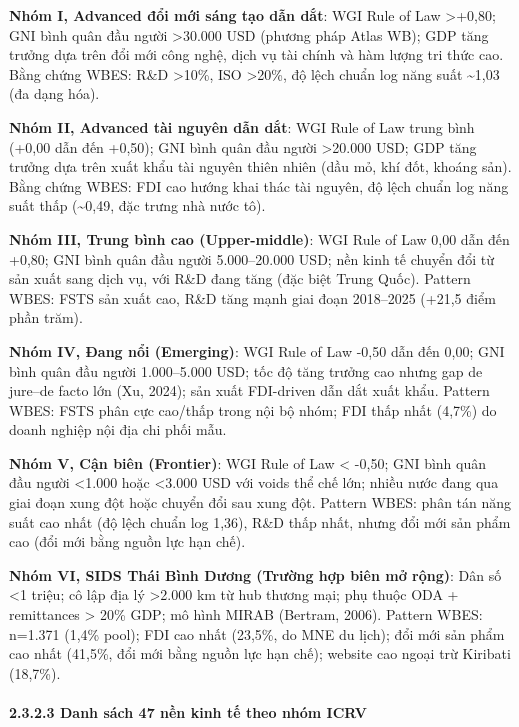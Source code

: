\documentclass[12pt,a4paper]{article}
\begin{document}
\textbf{Nhóm I, Advanced đổi mới sáng tạo dẫn dắt}: WGI Rule of Law
\textgreater+0,80; GNI bình quân đầu người \textgreater30.000 USD
(phương pháp Atlas WB); GDP tăng trưởng dựa trên đổi mới công nghệ, dịch
vụ tài chính và hàm lượng tri thức cao. Bằng chứng WBES: R\&D
\textgreater10\%, ISO \textgreater20\%, độ lệch chuẩn log năng suất
\textasciitilde1,03 (đa dạng hóa).

\textbf{Nhóm II, Advanced tài nguyên dẫn dắt}: WGI Rule of Law trung
bình (+0,00 dẫn đến +0,50); GNI bình quân đầu người \textgreater20.000
USD; GDP tăng trưởng dựa trên xuất khẩu tài nguyên thiên nhiên (dầu mỏ,
khí đốt, khoáng sản). Bằng chứng WBES: FDI cao hướng khai thác tài
nguyên, độ lệch chuẩn log năng suất thấp (\textasciitilde0,49, đặc trưng
nhà nước tô).

\textbf{Nhóm III, Trung bình cao (Upper-middle)}: WGI Rule of Law 0,00
dẫn đến +0,80; GNI bình quân đầu người 5.000--20.000 USD; nền kinh tế
chuyển đổi từ sản xuất sang dịch vụ, với R\&D đang tăng (đặc biệt Trung
Quốc). Pattern WBES: FSTS sản xuất cao, R\&D tăng mạnh giai đoạn
2018--2025 (+21,5 điểm phần trăm).

\textbf{Nhóm IV, Đang nổi (Emerging)}: WGI Rule of Law -0,50 dẫn đến
0,00; GNI bình quân đầu người 1.000--5.000 USD; tốc độ tăng trưởng cao
nhưng gap de jure--de facto lớn (Xu, 2024); sản xuất FDI-driven dẫn dắt
xuất khẩu. Pattern WBES: FSTS phân cực cao/thấp trong nội bộ nhóm; FDI
thấp nhất (4,7\%) do doanh nghiệp nội địa chi phối mẫu.

\textbf{Nhóm V, Cận biên (Frontier)}: WGI Rule of Law \textless{} -0,50;
GNI bình quân đầu người \textless1.000 hoặc \textless3.000 USD với voids
thể chế lớn; nhiều nước đang qua giai đoạn xung đột hoặc chuyển đổi sau
xung đột. Pattern WBES: phân tán năng suất cao nhất (độ lệch chuẩn log
1,36), R\&D thấp nhất, nhưng đổi mới sản phẩm cao (đổi mới bằng nguồn
lực hạn chế).

\textbf{Nhóm VI, SIDS Thái Bình Dương (Trường hợp biên mở rộng)}: Dân số
\textless1 triệu; cô lập địa lý \textgreater2.000 km từ hub thương mại;
phụ thuộc ODA + remittances \textgreater{} 20\% GDP; mô hình MIRAB
(Bertram, 2006). Pattern WBES: n=1.371 (1,4\% pool); FDI cao nhất
(23,5\%, do MNE du lịch); đổi mới sản phẩm cao nhất (41,5\%, đổi mới
bằng nguồn lực hạn chế); website cao ngoại trừ Kiribati (18,7\%).

\hypertarget{2323-danh-suxe1ch-47-nux1ec1n-kinh-tux1ebf-theo-nhuxf3m-icrv}{%
\paragraph{2.3.2.3 Danh sách 47 nền kinh tế theo nhóm
ICRV}\label{2323-danh-suxe1ch-47-nux1ec1n-kinh-tux1ebf-theo-nhuxf3m-icrv}}
\end{document}

